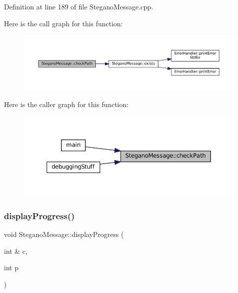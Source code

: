 Definition at line 189 of file Stegano\+Message.\+cpp.

Here is the call graph for this function\+:\nopagebreak
\begin{figure}[H]
\begin{center}
\leavevmode
\includegraphics[width=350pt]{classSteganoMessage_a9d87adef1584cc184ccd4b5d86fba744_cgraph}
\end{center}
\end{figure}
Here is the caller graph for this function\+:\nopagebreak
\begin{figure}[H]
\begin{center}
\leavevmode
\includegraphics[width=350pt]{classSteganoMessage_a9d87adef1584cc184ccd4b5d86fba744_icgraph}
\end{center}
\end{figure}
\mbox{\label{classSteganoMessage_a50936bb2352eaaa1112280c2ac3ca2d5}} 
\subsubsection{\texorpdfstring{displayProgress()}{displayProgress()}\hspace{0.1cm}{\footnotesize\ttfamily [1/2]}}
{\footnotesize\ttfamily void Stegano\+Message\+::display\+Progress (\begin{DoxyParamCaption}\item[{int \&}]{c,  }\item[{int}]{p }\end{DoxyParamCaption})\hspace{0.3cm}{\ttfamily [private]}}



